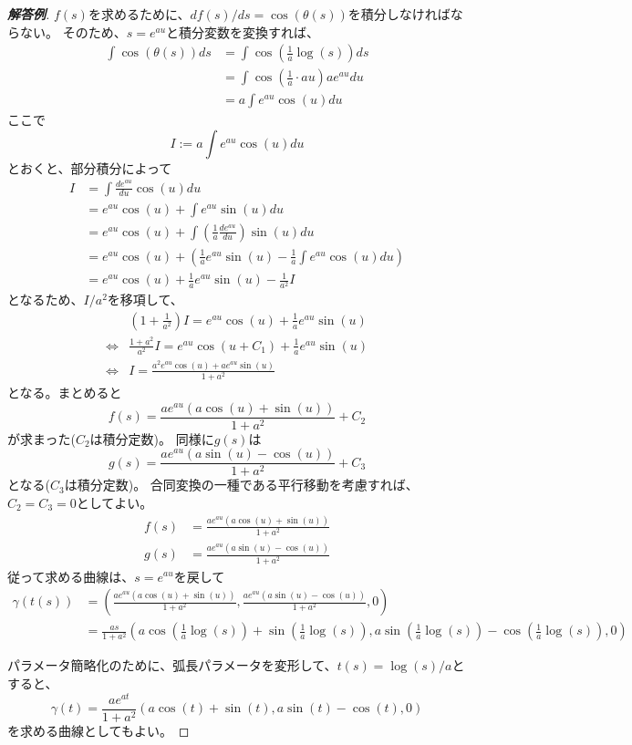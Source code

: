 \begin{proof}[\textbf{解答例}]
  $f(s)$を求めるために、$df(s)/ds=\cos(\theta(s))$を積分しなければならない。
  そのため、$s=e^{au}$と積分変数を変換すれば、
  \begin{align*}
    \int\cos(\theta(s))ds&=\int\cos\left(\frac1a\log(s)\right)ds\\
    &=\int\cos\left(\frac1a\cdot au\right)ae^{au}du\\
    &=a\int e^{au}\cos(u)du
  \end{align*}
  ここで
  \[
    I:=a\int e^{au}\cos(u)du
  \]
  とおくと、部分積分によって
  \begin{align*}
    I&=\int \frac{de^{au}}{du}\cos(u)du\\
    &=e^{au}\cos(u)+\int e^{au}\sin(u)du\\
    &=e^{au}\cos(u)+\int \left(\frac1a\frac{de^{au}}{du}\right)\sin(u)du\\
    &=e^{au}\cos(u)+\left(\frac1ae^{au}\sin(u)-\frac1a\int e^{au}\cos(u)du\right)\\
    &=e^{au}\cos(u)+\frac1ae^{au}\sin(u)-\frac1{a^2}I
  \end{align*}
  となるため、$I/a^2$を移項して、
  \begin{align*}
    &\left(1+\frac1{a^2}\right)I=e^{au}\cos(u)+\frac1ae^{au}\sin(u)\\
    \iff&\frac{1+a^2}{a^2}I=e^{au}\cos( u+C_1)+\frac1ae^{au}\sin(u)\\
    \iff&I=\frac{a^2e^{au}\cos(u)+ ae^{au}\sin(u)}{1+a^2}
  \end{align*}
  となる。まとめると
  \[
    f(s)=\frac{ae^{au}(a\cos(u)+\sin(u))}{1+a^2}+C_2
  \]
  が求まった($C_2$は積分定数)。
  同様に$g(s)$は
  \[
    g(s)=\frac{ae^{au}(a\sin(u)-\cos(u))}{1+a^2}+C_3
  \]
  となる($C_3$は積分定数)。
  合同変換の一種である平行移動を考慮すれば、$C_2=C_3=0$としてよい。
  \begin{align*}
    f(s)&=\frac{ae^{au}(a\cos(u)+\sin(u))}{1+a^2}\\
    g(s)&=\frac{ae^{au}(a\sin(u)-\cos(u))}{1+a^2}
  \end{align*}
  従って求める曲線は、$s=e^{au}$を戻して
  \begin{align*}
    \gamma(t(s))&=\left(\frac{ae^{au}(a\cos(u)+\sin(u))}{1+a^2},\frac{ae^{au}(a\sin(u)-\cos(u))}{1+a^2},0\right)\\
    &=\frac{as}{1+a^2}\left(a\cos\left(\frac1a\log(s)\right)+\sin\left(\frac1a\log(s)\right),a\sin\left(\frac1a\log(s)\right)-\cos\left(\frac1a\log(s)\right),0\right)
  \end{align*}

  パラメータ簡略化のために、弧長パラメータを変形して、$t(s)=\log(s)/a$とすると、
  \[
    \gamma(t)=\frac{ae^{at}}{1+a^2}(a\cos(t)+\sin(t),a\sin(t)-\cos(t),0)
  \]
  を求める曲線としてもよい。
\end{proof}

